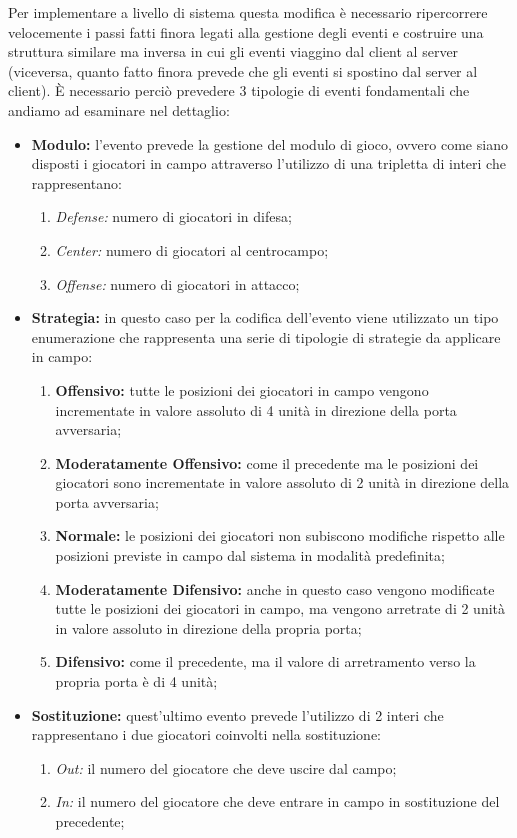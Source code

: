 \documentclass[aps,letterpaper,10pt]{article}
\begin{document}
Per implementare a livello di sistema questa modifica \`e necessario ripercorrere velocemente i passi fatti finora legati alla gestione degli eventi e costruire una struttura similare ma inversa in cui gli eventi viaggino dal client al server (viceversa, quanto fatto finora prevede che gli eventi si spostino dal server al client). \`E necessario perci\`o prevedere 3 tipologie di eventi fondamentali che andiamo ad esaminare nel dettaglio:

\begin{itemize}
	\item \textbf{Modulo:} l'evento prevede la gestione del modulo di gioco, ovvero come siano disposti i giocatori in campo attraverso l'utilizzo di una tripletta di interi che rappresentano:
	\begin{enumerate}
		\item \emph{Defense:} numero di giocatori in difesa;
		\item \emph{Center:} numero di giocatori al centrocampo;
		\item \emph{Offense:} numero di giocatori in attacco;
	\end{enumerate}
	\item \textbf{Strategia:} in questo caso per la codifica dell'evento viene utilizzato un tipo enumerazione che rappresenta una serie di tipologie di strategie da applicare in campo:
	\begin{enumerate}
		\item \textbf{Offensivo:} tutte le posizioni dei giocatori in campo vengono incrementate in valore assoluto di 4 unit\`a in direzione della porta avversaria;
		\item \textbf{Moderatamente Offensivo:} come il precedente ma le posizioni dei giocatori sono incrementate in valore assoluto di 2 unit\`a in direzione della porta avversaria;
		\item \textbf{Normale:} le posizioni dei giocatori non subiscono modifiche rispetto alle posizioni previste in campo dal sistema in modalit\`a predefinita;
		\item \textbf{Moderatamente Difensivo:} anche in questo caso vengono modificate tutte le posizioni dei giocatori in campo, ma vengono arretrate di 2 unit\`a in valore assoluto in direzione della propria porta;
		\item \textbf{Difensivo:} come il precedente, ma il valore di arretramento verso la propria porta \`e di 4 unit\`a;
	\end{enumerate}
	\item \textbf{Sostituzione:} quest'ultimo evento prevede l'utilizzo di 2 interi che rappresentano i due giocatori coinvolti nella sostituzione:
	\begin{enumerate}
		\item \emph{Out:} il numero del giocatore che deve uscire dal campo;
		\item \emph{In:} il numero del giocatore che deve entrare in campo in sostituzione del precedente;
	\end{enumerate}
\end{itemize}
\end{document}
